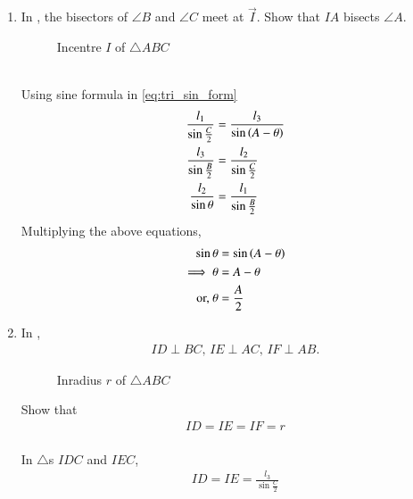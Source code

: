 
\begin{enumerate}[label=\thesection.\arabic*.,ref=\thesection.\theenumi]
\item  In  
	, the bisectors of $\angle B$ and $\angle C$	 meet at $\vec{I}$.
Show that $IA$ bisects $\angle A$.
\begin{figure}[!ht]
	\begin{center}
		
		\resizebox{\columnwidth}{!}{}
	\end{center}
	\caption{Incentre $I$ of $\triangle ABC$}
	\label{fig:tri_icentre}	
\end{figure}
\\
\solution
Using sine formula
in
\eqref{eq:tri_sin_form}
  \begin{align}
  \frac{l_1}{\sin\frac{C}{2}}
  &= 
   \frac{l_3}{\sin \left(A-\theta\right)}
  \\
   \frac{l_3}{\sin\frac{B}{2}}
&=\frac{l_2}{\sin\frac{C}{2}}
  \\
\frac{l_2}{\sin \theta}
	  &=
  \frac{l_1}{\sin\frac{B}{2}}
  \end{align}
  Multiplying the above equations, 
  \begin{align}
  \sin \theta &= \sin \left(A - \theta\right)
  \\
	  \implies \theta &=A - \theta 
  \\
	  \text{or, } \theta &= \frac{A}{2}
  \end{align}
  \item In
	, 
  \begin{align}
	  ID \perp BC, \, 
	  IE \perp AC, \, 
	  IF \perp AB.
  \end{align}
		\begin{figure}[!ht]
	\begin{center}
		\resizebox{\columnwidth}{!}{}
	\end{center}
	\caption{Inradius $r$ of $\triangle ABC$}
	\label{fig:tri_iradius}	
\end{figure}
  Show that 
  \begin{align}
	  ID=   
	  IE= 
	  IF=r 
	\label{eq:tri_iradius}	
  \end{align}
  \\
		\solution
In $\triangle$s $IDC$ and $IEC$, 
		\begin{align}
ID = IE=  \frac{l_3}{\sin\frac{C}{2}}
		\end{align}

\end{enumerate}
